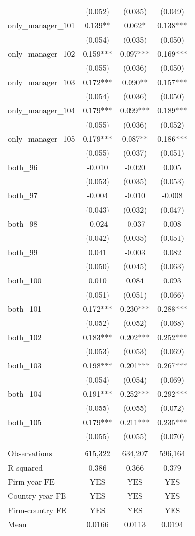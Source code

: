 \begin{tabular}{lccc}
 & (0.052) & (0.035) & (0.049) \\
only\_manager\_101 & 0.139** & 0.062* & 0.138*** \\
 & (0.054) & (0.035) & (0.050) \\
only\_manager\_102 & 0.159*** & 0.097*** & 0.169*** \\
 & (0.055) & (0.036) & (0.050) \\
only\_manager\_103 & 0.172*** & 0.090** & 0.157*** \\
 & (0.054) & (0.036) & (0.050) \\
only\_manager\_104 & 0.179*** & 0.099*** & 0.189*** \\
 & (0.055) & (0.036) & (0.052) \\
only\_manager\_105 & 0.179*** & 0.087** & 0.186*** \\
 & (0.055) & (0.037) & (0.051) \\
both\_96 & -0.010 & -0.020 & 0.005 \\
 & (0.053) & (0.035) & (0.053) \\
both\_97 & -0.004 & -0.010 & -0.008 \\
 & (0.043) & (0.032) & (0.047) \\
both\_98 & -0.024 & -0.037 & 0.008 \\
 & (0.042) & (0.035) & (0.051) \\
both\_99 & 0.041 & -0.003 & 0.082 \\
 & (0.050) & (0.045) & (0.063) \\
both\_100 & 0.010 & 0.084 & 0.093 \\
 & (0.051) & (0.051) & (0.066) \\
both\_101 & 0.172*** & 0.230*** & 0.288*** \\
 & (0.052) & (0.052) & (0.068) \\
both\_102 & 0.183*** & 0.202*** & 0.252*** \\
 & (0.053) & (0.053) & (0.069) \\
both\_103 & 0.198*** & 0.201*** & 0.267*** \\
 & (0.054) & (0.054) & (0.069) \\
both\_104 & 0.191*** & 0.252*** & 0.292*** \\
 & (0.055) & (0.055) & (0.072) \\
both\_105 & 0.179*** & 0.211*** & 0.235*** \\
 & (0.055) & (0.055) & (0.070) \\
 &  &  &  \\
Observations & 615,322 & 634,207 & 596,164 \\
R-squared & 0.386 & 0.366 & 0.379 \\
Firm-year FE & YES & YES & YES \\
Country-year FE & YES & YES & YES \\
Firm-country FE & YES & YES & YES \\
 Mean & 0.0166 & 0.0113 & 0.0194 \\ \hline
\end{tabular}
